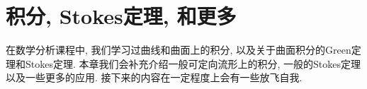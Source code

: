 \chapter{积分, Stokes定理, 和更多}
在数学分析课程中, 我们学习过曲线和曲面上的积分, 以及关于曲面积分的Green定理和Stokes定理.
本章我们会补充介绍一般可定向流形上的积分, 一般的Stokes定理以及一些更多的应用.
接下来的内容在一定程度上会有一些放飞自我.